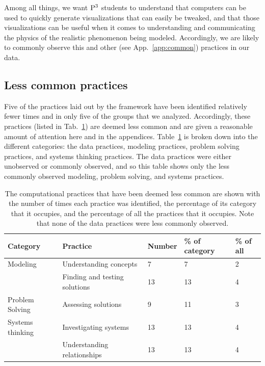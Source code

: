 \documentclass{msuphddissertation}
\begin{document}
\begin{doublespace}
Among all things, we want ${\rm P}^{3}$ students to understand that computers can be used to quickly generate visualizations that can easily be tweaked, and that those visualizations can be useful when it comes to understanding and communicating the physics of the realistic phenomenon being modeled.  Accordingly, we are likely to commonly observe this and other (see App.~\ref{app:common}) practices in our data.

\subsection{Less common practices}\label{CH6:LessCommonPractices}

Five of the practices laid out by the framework have been identified relatively fewer times and in only five of the groups that we analyzed.  Accordingly, these practices (listed in Tab.~\ref{CH6:LessCommon}) are deemed less common and are given a reasonable amount of attention here and in the appendices.  Table~\ref{CH6:LessCommon} is broken down into the different categories: the data practices, modeling practices, problem solving practices, and systems thinking practices.  The data practices were either unobserved or commonly observed, and so this table shows only the less commonly observed modeling, problem solving, and systems practices.

\begin{table}[ht]\centering
\begin{tabular}{lllll}\hline\hline
Category & Practice & Number & \% of category & \% of all \\\hline
Modeling & Understanding concepts & 7 & 7 & 2 \\
 & Finding and testing solutions & 13 & 13 & 4 \\\hline
Problem Solving & Assessing solutions & 9 & 11 & 3 \\\hline
Systems thinking & Investigating systems & 13 & 13 & 4 \\
 & Understanding relationships & 13 & 13 & 4 \\\hline\hline
\end{tabular}
\caption{The computational practices that have been deemed less common are shown with the number of times each practice was identified, the percentage of its category that it occupies, and the percentage of all the practices that it occupies.  Note that none of the data practices were less commonly observed.}\label{CH6:LessCommon}
\end{table}


\end{doublespace}
\end{document}
